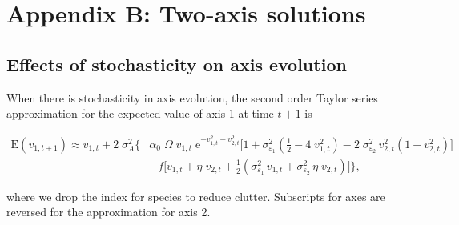 
\renewcommand{\thefigure}{B\arabic{figure}}
\renewcommand{\theequation}{B\arabic{equation}}
\renewcommand{\thetable}{B\arabic{table}}
\setcounter{equation}{0}
\setcounter{figure}{0}
\setcounter{table}{0}


\section*{Appendix B: Two-axis solutions}



\subsection*{Effects of stochasticity on axis evolution}

When there is stochasticity in axis evolution,
the second order Taylor series approximation for the expected
value of axis 1 at time $t+1$ is

\begin{equation}
\label{eq:taylor-expansion-final}
\begin{split}
    \text{E}(v_{1,t+1}) \approx
        v_{1,t} + 2 \; \sigma_A^2 \Bigg\{ 
            & \alpha_0 \; \Omega \; v_{1,t} \; \text{e}^{-v_{1,t}^2 - v_{2,t}^2} 
            \bigg[ 
                1 + \sigma^2_{\varepsilon_1} \left( \frac{1}{2} - 4 \; v_{1,t}^2 \right)
                - 2 \; \sigma^2_{\varepsilon_2} \, v_{2,t}^2 \left( 1 - v_{2,t}^2 \right)
            \bigg] \\
            & - f \bigg[
                v_{1,t} + \eta \; v_{2,t} + \frac{1}{2} \left(
                    \sigma^2_{\varepsilon_1} \, v_{1,t} + \sigma^2_{\varepsilon_2} \, \eta \; v_{2,t}
                \right)
            \bigg]
        \Bigg\}
\text{,}
\end{split}
\end{equation}

where we drop the index for species to reduce clutter.
Subscripts for axes are reversed for the approximation for axis 2.





